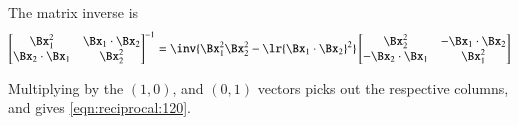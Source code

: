 {The matrix inverse is
\begin{dmath}\label{eqn:2dreciprocalMatrixCalculation:240}
{
\begin{bmatrix}
\Bx_1^2 & \Bx_1 \cdot \Bx_2 \\
\Bx_2 \cdot \Bx_1 & \Bx_2^2 \\
\end{bmatrix}
}^{-1}
=
\inv{ \Bx_1^2 \Bx_2^2 - \lr{\Bx_1 \cdot \Bx_2}^2 }
\begin{bmatrix}
\Bx_2^2 & -\Bx_1 \cdot \Bx_2 \\
-\Bx_2 \cdot \Bx_1 & \Bx_1^2 \\
\end{bmatrix}
\end{dmath}

Multiplying by the \( (1,0) \), and \( (0,1) \) vectors picks out the respective columns, and gives \cref{eqn:reciprocal:120}.
} %
